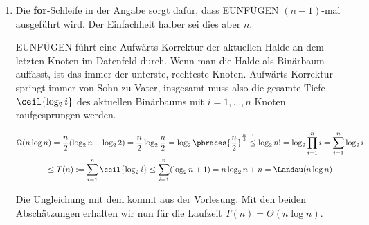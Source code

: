 \begin{solution}
\begin{enumerate}[label = \alph*]
\begin{center}

    \end{center}

    \item Die \textbf{for}-Schleife in der Angabe sorgt dafür, dass EUNFÜGEN $(n-1)$-mal ausgeführt wird.
    Der Einfachheit halber sei dies aber $n$.

    EUNFÜGEN führt eine Aufwärts-Korrektur der aktuellen Halde an dem letzten Knoten im Datenfeld durch.
    Wenn man die Halde als Binärbaum auffasst, ist das immer der unterste, rechteste Knoten.
    Aufwärts-Korrektur springt immer von Sohn zu Vater, insgesamt muss also die gesamte Tiefe $\ceil{\log_2 i}$ des aktuellen Binärbaums mit $i = 1, \dots, n$ Knoten raufgesprungen werden.

    \begin{multline*}
        \Omega(n \log n)
        =
        \frac{n}{2} (\log_2 n - \log_2 2)
        =
        \frac{n}{2} \log_2 \frac{n}{2}
        =
        \log_2 \pbraces{\frac{n}{2}}^\frac{n}{2}
        \stackrel{!}{\leq}
        \log_2 n!
        =
        \log_2 \prod_{i=1}^n i
        =
        \sum_{i=1}^n \log_2 i \\
        \leq
        T(n)
        :=
        \sum_{i=1}^n \ceil{\log_2 i}
        \leq
        \sum_{i=1}^n (\log_2 n + 1)
        =
        n \log_2 n + n
        =
        \Landau(n \log n)
    \end{multline*}

    Die Ungleichung mit dem \Quote{!} kommt aus der Vorlesung.
    Mit den beiden Abschätzungen erhalten wir nun für die Laufzeit $T(n) = \Theta(n \log n)$.

\end{enumerate}

\end{solution}
